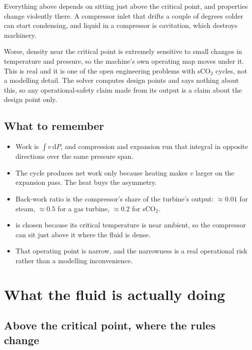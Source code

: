 \documentclass[11pt,a4paper]{report}
\begin{document}
\begin{caveat}[title={Caveat: this operating point is a knife edge}]
Everything above depends on sitting just above the critical point, and
properties change violently there. A compressor inlet that drifts a couple
of degrees colder can start condensing, and liquid in a compressor is
cavitation, which destroys machinery.

Worse, density near the critical point is extremely sensitive to small
changes in temperature and pressure, so the machine's own operating map
moves under it. This is real and it is one of the open engineering problems
with sCO$_2$ cycles, not a modelling detail. The solver computes design
points and says nothing about this, so any operational-safety claim made
from its output is a claim about the design point only.
\end{caveat}

\section{What to remember}

\begin{itemize}\itemsep2pt
\item Work is $\int v\,\mathrm{d}P$, and compression and expansion run that
      integral in opposite directions over the same pressure span.
\item The cycle produces net work only because heating makes $v$ larger on
      the expansion pass. The heat buys the asymmetry.
\item Back-work ratio is the compressor's share of the turbine's output:
      $\approx 0.01$ for steam, $\approx 0.5$ for a gas turbine,
      $\approx 0.2$ for sCO$_2$.
\item {} is chosen because its critical temperature is near ambient,
      so the compressor can sit just above it where the fluid is dense.
\item That operating point is narrow, and the narrowness is a real
      operational risk rather than a modelling inconvenience.
\end{itemize}

\chapter{What the fluid is actually doing}
\label{ch:props}

\section{Above the critical point, where the rules change}
\end{document}
